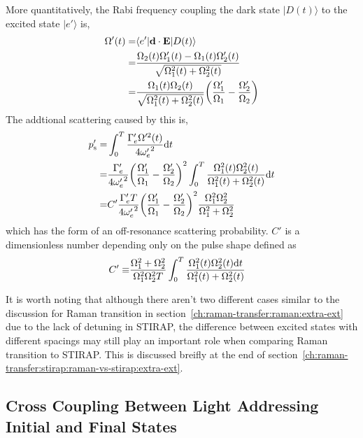 More quantitatively,
the Rabi frequency coupling the dark state $|D(t)\rangle$ to the excited state $|e'\rangle$ is,
\begin{align*}
  \Omega'(t)=&\langle e'|\mathbf{d}\cdot\mathbf{E}|D(t)\rangle\\
  =&\frac{\Omega_2(t)\Omega'_1(t)-\Omega_1(t)\Omega'_2(t)}{\sqrt{\Omega_1^2(t)+\Omega_2^2(t)}}\\
  =&\frac{\Omega_1(t)\Omega_2(t)}{\sqrt{\Omega_1^2(t)+\Omega_2^2(t)}}{\left({\frac{\Omega'_1}{\Omega_1}-\frac{\Omega'_2}{\Omega_2}}\right)}
\end{align*}
The addtional scattering caused by this is,
\begin{align*}
  p'_{\mathrm{s}}=&\int_0^T \frac{\Gamma'_e\Omega'^2(t)}{4{\omega'_e}^2} \mathrm{d} t\\
  =&\frac{\Gamma'_e}{4{\omega'_e}^2}
     {\left({\frac{\Omega'_1}{\Omega_1}-\frac{\Omega'_2}{\Omega_2}}\right)}^2
     \int_0^T \frac{\Omega_1^2(t)\Omega_2^2(t)}{\Omega_1^2(t)+\Omega_2^2(t)} \mathrm{d} t\\
  =&C'\frac{\Gamma'_eT}{4{\omega'_e}^2}
     {\left({\frac{\Omega'_1}{\Omega_1}-\frac{\Omega'_2}{\Omega_2}}\right)}^2
     \frac{\Omega_1^2\Omega_2^2}{\Omega_1^2+\Omega_2^2}
\end{align*}
which has the form of an off-resonance scattering probability.
$C'$ is a dimensionless number depending only on the pulse shape defined as
\begin{align*}
  C'\equiv&\frac{\Omega_1^2+\Omega_2^2}{\Omega_1^2\Omega_2^2T}\int_0^T \frac{\Omega_1^2(t)\Omega_2^2(t)\mathrm{d} t}{\Omega_1^2(t)+\Omega_2^2(t)}
\end{align*}

It is worth noting that although there aren't two different cases similar to
the discussion for Raman transition in section~\ref{ch:raman-transfer:raman:extra-ext}
due to the lack of detuning in STIRAP,
the difference between excited states with different spacings may still play an important role
when comparing Raman transition to STIRAP.
This is discussed breifly at the end of
section~\ref{ch:raman-transfer:stirap:raman-vs-stirap:extra-ext}.

\subsection{Cross Coupling Between Light Addressing Initial and Final States}
\label{ch:raman-transfer:stirap:cross-couple}

